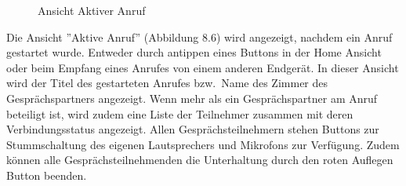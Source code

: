\begin{figure}[h]
\begin{minipage}[b]{0.45\textwidth}
        \caption{Ansicht Aktiver Anruf}
    \end{minipage}
    \label{fig:MobileClient-Screens3}
\end{figure}

Die Ansicht ''Aktive Anruf'' (Abbildung 8.6) wird angezeigt, nachdem ein Anruf gestartet wurde.
Entweder durch antippen eines Buttons in der Home Ansicht oder beim Empfang eines Anrufes von einem anderen Endgerät.
In dieser Ansicht wird der Titel des gestarteten Anrufes bzw.\ Name des Zimmer des Gesprächspartners angezeigt.
Wenn mehr als ein Gesprächspartner am Anruf beteiligt ist, wird zudem eine Liste der Teilnehmer zusammen mit deren Verbindungsstatus angezeigt.
Allen Gesprächsteilnehmern stehen Buttons zur Stummschaltung des eigenen Lautsprechers und Mikrofons zur Verfügung.
Zudem können alle Gesprächsteilnehmenden die Unterhaltung durch den roten Auflegen Button beenden.

